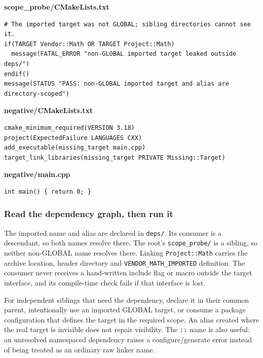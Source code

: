 \textbf{scope\_probe/CMakeLists.txt}

\begin{verbatim}
# The imported target was not GLOBAL; sibling directories cannot see it.
if(TARGET Vendor::Math OR TARGET Project::Math)
  message(FATAL_ERROR "non-GLOBAL imported target leaked outside deps/")
endif()
message(STATUS "PASS: non-GLOBAL imported target and alias are directory-scoped")
\end{verbatim}

\textbf{negative/CMakeLists.txt}

\begin{verbatim}
cmake_minimum_required(VERSION 3.18)
project(ExpectedFailure LANGUAGES CXX)
add_executable(missing_target main.cpp)
target_link_libraries(missing_target PRIVATE Missing::Target)
\end{verbatim}

\textbf{negative/main.cpp}

\begin{verbatim}
int main() { return 0; }
\end{verbatim}

\subsubsection{Read the dependency graph, then run it}\label{05-engine-i-ch012-read-the-dependency-graph-then-run-it}

\hypertarget{05-engine-i-ch012-read-the-dependency-graph-then-run-it}{}

The imported name and alias are declared in \texttt{deps/}. Its consumer is a descendant, so both names resolve there. The root's \texttt{scope\_probe/} is a sibling, so neither non-GLOBAL name resolves there. Linking \texttt{Project::Math} carries the archive location, header directory and \texttt{VENDOR\_MATH\_IMPORTED} definition. The consumer never receives a hand-written include flag or macro outside the target interface, and its compile-time check fails if that interface is lost.

For independent siblings that need the dependency, declare it in their common parent, intentionally use an imported GLOBAL target, or consume a package configuration that defines the target in the required scope. An alias created where the real target is invisible does not repair visibility. The \texttt{::} name is also useful: an unresolved namespaced dependency raises a configure/generate error instead of being treated as an ordinary raw linker name.

